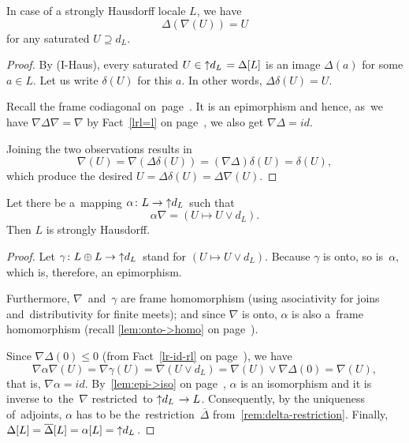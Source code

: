 \begin{lem} \label{lem:delta-nabla=id}
  In case of a strongly Hausdorff locale $L$, we have
  \[
    \Delta(\nabla(U)) = U
  \]
  for any saturated $U \supseteq d_L$.
\end{lem}
\begin{proof}
  By (I-Haus), every saturated $U\in \left\uparrow d_L \right. = \Delta[L]$ is an image $\Delta(a)$
  for some $a\in L$.
  Let us write $\delta(U)$ for this $a$.
  In other words, $\Delta\delta(U) = U$.

  Recall the frame codiagonal on~page~\pageref{codiag-in-Frm}\thinspace.
  It is an epimorphism and hence, as~we have $\nabla \Delta \nabla = \nabla$ by
  Fact~\ref{lrl=l} on page~\pageref{lrl=l}\thinspace, we also get $\nabla
  \Delta = id$.

  Joining the two observations results in
  \[
    \nabla (U) = \nabla (\Delta\delta (U)) = (\nabla \Delta)\delta (U) =
    \delta(U),
  \]
  which produce the desired $U = \Delta \delta (U) = \Delta \nabla (U)$.
\end{proof}

\begin{lem} \label{lem:mapping->IHaus}
  Let there be a~mapping $\alpha\colon L \to \left\uparrow d_L \right.$ such that
  \[
    \alpha \nabla = (U \mapsto U \vee d_L).
  \]
  Then $L$ is strongly Hausdorff.
\end{lem}
\begin{proof}
  Let $\gamma\colon L \oplus L \to \left\uparrow d_L \right.$ stand for $(U \mapsto U \vee d_L)$.
  Because $\gamma$ is onto, so is~$\alpha$, which is, therefore, an
  epimorphism.

  Furthermore, $\nabla$~and~$\gamma$ are frame homomorphism (using asociativity
  for joins and~distributivity for finite meets);
  and since $\nabla$ is onto, $\alpha$ is also a~frame homomorphism (recall
  \ref{lem:onto->homo} on page~\pageref{lem:onto->homo}\thinspace).

  Since $\nabla \Delta (0) \le 0$ (from Fact~\ref{lr-id-rl} on
  page~\pageref{lr-id-rl}\thinspace), we have
  \[
    \nabla \alpha \nabla(U)
    = \nabla \gamma(U)
    = \nabla (U \vee d_L)
    = \nabla (U) \vee \nabla \Delta(0)
    = \nabla (U),
  \]
  that is, $\nabla \alpha = id$.
  By~\ref{lem:epi->iso} on page~\pageref{lem:epi->iso}\thinspace, $\alpha$ is
  an isomorphism and it is inverse to~the~$\nabla$ restricted~to $\left\uparrow d_L \right. \to L$.
  Consequently, by the uniqueness of~adjoints, $\alpha$ has to be
  the~restriction~$\overline{\Delta}$
  from~\ref{rem:delta-restriction}\thinspace.
  Finally, $\Delta[L] = \overline{\Delta}[L] = \alpha[L] = \left\uparrow d_L \right.$.
\end{proof}

